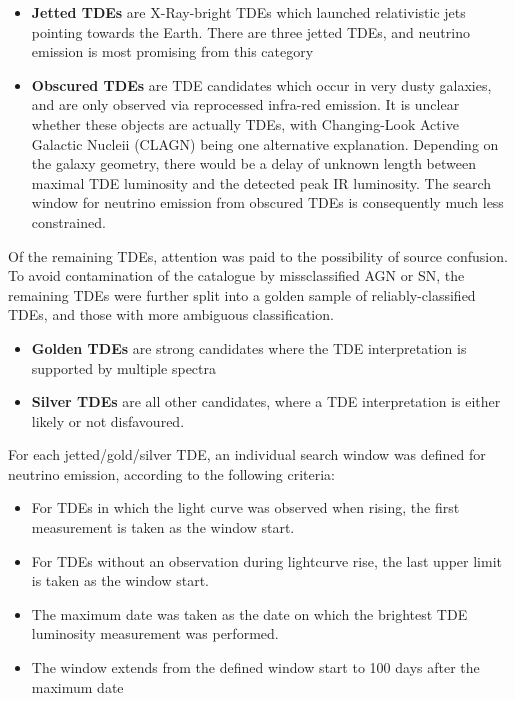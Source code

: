 \documentclass[twocolumn, tighten, linenumbers]{aastex62}
\begin{document}
\begin{itemize}
	\item \textbf{Jetted TDEs} are X-Ray-bright TDEs which launched relativistic jets pointing towards the Earth. There are three jetted TDEs, and neutrino emission is most promising from this category
	
	\item \textbf{Obscured TDEs} are TDE candidates which occur in very dusty galaxies, and are only observed via reprocessed infra-red emission. It is unclear whether these objects are actually TDEs, with Changing-Look Active Galactic Nucleii (CLAGN) being one alternative explanation. Depending on the galaxy geometry, there would be a delay of unknown length between maximal TDE luminosity and the detected peak IR luminosity. The search window for neutrino emission from obscured TDEs is consequently much less constrained.
\end{itemize}
Of the remaining TDEs, attention was paid to the possibility of source confusion. To avoid contamination of the catalogue by missclassified AGN or SN, the remaining TDEs were further split into a golden sample of reliably-classified TDEs, and those with more ambiguous classification.
\begin{itemize}
	\item \textbf{Golden TDEs} are strong candidates where the TDE interpretation is supported by multiple spectra
	\item \textbf{Silver TDEs} are all other candidates, where a TDE interpretation is either likely or not disfavoured.
\end{itemize}

For each jetted/gold/silver TDE, an individual search window was defined for neutrino emission, according to the following criteria:

\begin{itemize}
	\item For TDEs in which the light curve was observed when rising, the first measurement is taken as the window start.
	
	\item For TDEs without an observation during lightcurve rise, the last upper limit is taken as the window start.
	
	\item The maximum date was taken as the date on which the brightest TDE luminosity measurement was performed.
	
	\item The window extends from the defined window start to 100 days after the maximum date
	
\end{itemize}
\end{document}
